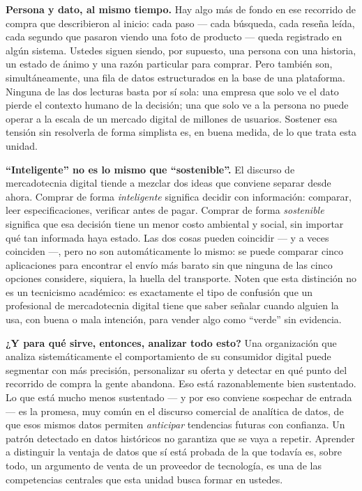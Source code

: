 \documentclass[12pt,letterpaper]{article}
\begin{document}
\textbf{Persona y dato, al mismo tiempo.} Hay algo más de fondo en ese
recorrido de compra que describieron al inicio: cada paso --- cada búsqueda,
cada reseña leída, cada segundo que pasaron viendo una foto de producto ---
queda registrado en algún sistema. Ustedes siguen siendo, por supuesto, una
persona con una historia, un estado de ánimo y una razón particular para
comprar. Pero también son, simultáneamente, una fila de datos estructurados
en la base de una plataforma. Ninguna de las dos lecturas basta por sí sola:
una empresa que solo ve el dato pierde el contexto humano de la decisión;
una que solo ve a la persona no puede operar a la escala de un mercado
digital de millones de usuarios. Sostener esa tensión sin resolverla de
forma simplista es, en buena medida, de lo que trata esta unidad.

\textbf{\enquote{Inteligente} no es lo mismo que \enquote{sostenible}.} El discurso de
mercadotecnia digital tiende a mezclar dos ideas que conviene separar desde
ahora. Comprar de forma \emph{inteligente} significa decidir con información:
comparar, leer especificaciones, verificar antes de pagar. Comprar de forma
\emph{sostenible} significa que esa decisión tiene un menor costo ambiental y
social, sin importar qué tan informada haya estado. Las dos cosas pueden
coincidir --- y a veces coinciden ---, pero no son automáticamente lo mismo:
se puede comparar cinco aplicaciones para encontrar el envío más barato sin
que ninguna de las cinco opciones considere, siquiera, la huella del
transporte. Noten que esta distinción no es un tecnicismo académico: es
exactamente el tipo de confusión que un profesional de mercadotecnia digital
tiene que saber señalar cuando alguien la usa, con buena o mala intención,
para vender algo como \enquote{verde} sin evidencia.

\textbf{¿Y para qué sirve, entonces, analizar todo esto?} Una organización que
analiza sistemáticamente el comportamiento de su consumidor digital puede
segmentar con más precisión, personalizar su oferta y detectar en qué punto
del recorrido de compra la gente abandona. Eso está razonablemente bien
sustentado. Lo que está mucho menos sustentado --- y por eso conviene
sospechar de entrada --- es la promesa, muy común en el discurso comercial de
analítica de datos, de que esos mismos datos permiten \emph{anticipar}
tendencias futuras con confianza. Un patrón detectado en datos históricos no
garantiza que se vaya a repetir. Aprender a distinguir la ventaja de datos
que sí está probada de la que todavía es, sobre todo, un argumento de venta
de un proveedor de tecnología, es una de las competencias centrales que esta
unidad busca formar en ustedes.
\end{document}

